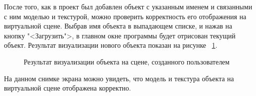 После того, как в проект был добавлен объект с указанным именем и связанными с ним моделью и текстурой, можно проверить корректность его отображения на виртуальной сцене. Выбрав имя объекта в выпадающем списке, и нажав на кнопку "<Загрузить">, в главном окне программы будет отрисован текущий объект. Результат визуализации нового объекта показан на рисунке ~\ref{screen14:image}.

\begin{figure}[H]
	\caption{Результат визуализации объекта на сцене, созданного пользователем}
	\label{screen14:image}
\end{figure}

На данном снимке экрана можно увидеть, что модель и текстура объекта на виртуальной сцене отображена корректно.